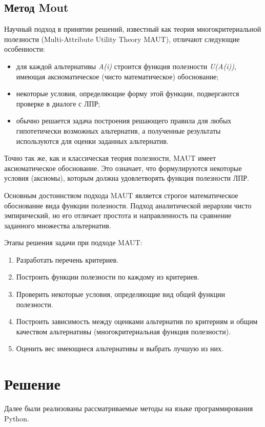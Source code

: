 \subsection{Метод Mout}
Научный подход в принятии решений, известный как теория многокритериальной
полезности (Multi-Attribute Utility Theory MAUT),
отличают следующие особенности:
\begin{itemize}
    \item для каждой альтернативы \textit{A(i)} строится функция
    полезности \textit{U(A(i))}, имеющая аксиоматическое
    (чисто математическое) обоснование;
    \item некоторые условия, определяющие форму этой функции,
    подвергаются проверке в диалоге с ЛПР;
    \item обычно решается задача построения решающего правила для любых
    гипотетически возможных альтернатив, а полученные результаты
    используются для оценки заданных альтернатив.
\end{itemize}

Точно так же, как и классическая теория полезности, MAUT имеет
аксиоматическое обоснование. Это означает, что формулируются
некоторые условия (аксиомы), которым должна удовлетворять функция
полезности ЛПР.\par
Основным достоинством подхода MAUT является строгое математическое
обоснование вида функции полезности. Подход аналитической иерархии чисто
эмпирический, но его отличает простота и направленность па сравнение
заданного множества альтернатив.

Этапы решения задачи при подходе MAUT:
\begin{enumerate}
    \item Разработать перечень критериев.
    \item Построить функции полезности по каждому из критериев.
    \item Проверить некоторые условия, определяющие вид общей
    функции полезности.
    \item Построить зависимость между оценками альтернатив
    по критериям и общим качеством альтернативы
    (многокритериальная функция полезности).
    \item Оценить вес имеющиеся альтернативы и выбрать лучшую из них.
\end{enumerate}

\section{Решение}
Далее были реализованы рассматриваемые методы на языке программирования
Python.

